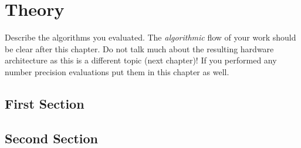 

\chapter{Theory}
Describe the algorithms you evaluated. The \textit{algorithmic} flow
of your work should be clear after this chapter. Do not talk much
about the resulting hardware architecture as this is a different topic
(next chapter)! If you performed any number precision evaluations put
them in this chapter as well.

\section{First Section}


\section{Second Section}


